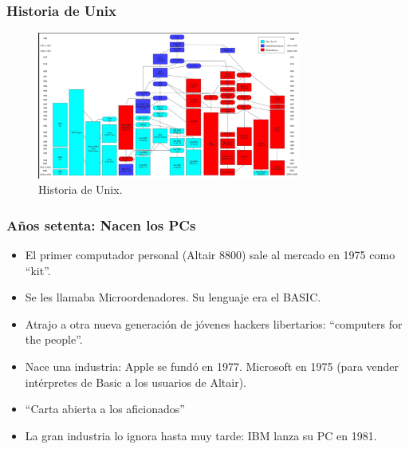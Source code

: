 \documentclass{beamer}
\begin{document}

\begin{frame}
\frametitle{Historia de Unix}


\begin{figure}[h]

\begin{center}
  \includegraphics[height=1.90in]{figs/Unix_history-simple.jpg}
  \caption{{\footnotesize Historia de Unix.}}
\end{center}
\end{figure}


\end{frame}





\begin{frame}
\frametitle{Años setenta: Nacen los PCs}

\begin{itemize}

\item El primer computador personal (Altair 8800) sale al mercado en 1975 como ``kit''. 
\item Se les llamaba Microordenadores. Su lenguaje era el BASIC.
\item Atrajo a otra nueva generación de jóvenes hackers libertarios: ``computers for the people''.
\item Nace una industria: Apple se fundó en 1977. Microsoft en 1975 (para vender intérpretes de Basic a los usuarios de Altair). 
\item ``Carta abierta a los aficionados''
\item La gran industria lo ignora hasta muy tarde: IBM lanza su PC en 1981.

\end{itemize}

\end{frame}


\end{document}
